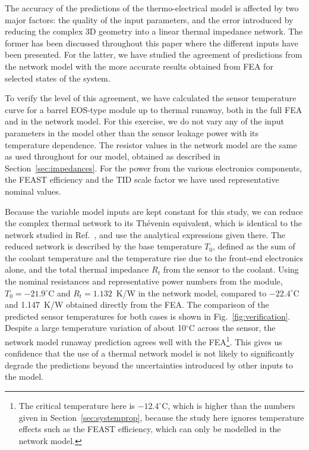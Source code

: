 The accuracy of the predictions of the thermo-electrical model is affected by two major factors: the quality of the input parameters, and the error introduced by reducing the complex 3D geometry into a linear thermal impedance network. The former has been discussed throughout this paper where the different inputs have been presented. For the latter, we have studied the agreement of predictions from the network model with the more accurate results obtained from FEA for selected states of the system.

To verify the level of this agreement, we have calculated the sensor temperature curve for a barrel EOS-type module up to thermal runaway, both in the full FEA and in the network model. For this exercise, we do not vary any of the input parameters in the model other than the sensor leakage power with its temperature dependence. The resistor values in the network model are the same as used throughout for our model, obtained as described in Section~\ref{sec:impedances}. For the power from the various electronics components, the FEAST efficiency and the TID scale factor we have used representative nominal values.

Because the variable model inputs are kept constant for this study, we can reduce the complex thermal network to its Th\'{e}venin equivalent, which is identical to the network studied in Ref.~\cite{Beck:2010zzd}, and use the analytical expressions given there. The reduced network is described by the base temperature $T_0$, defined as the sum of the coolant temperature and the temperature rise due to the front-end electronics alone, and the total thermal impedance $R_t$ from the sensor to the coolant. Using the nominal resistances and representative power numbers from the module, $T_0=-21.9^\circ$C and $R_t=1.132$~K/W in the network model, compared to $-22.4^\circ$C and 1.147~K/W obtained directly from the FEA. The comparison of the predicted sensor temperatures for both cases is shown in Fig.~\ref{fig:verification}. Despite a large temperature variation of about 10$^\circ$C across the sensor, the network model runaway prediction agrees well with the FEA\footnote{The critical temperature here is $-12.4^\circ$C, which is higher than the numbers given in Section~\ref{sec:systemprop}, because the study here ignores temperature effects such as the FEAST efficiency, which can only be modelled in the network model.}. This gives us confidence that the use of a thermal network model is not likely to significantly degrade the predictions beyond the uncertainties introduced by other inputs to the model. 

